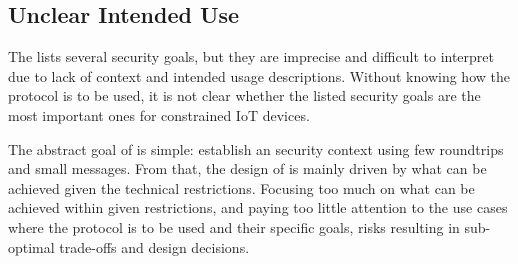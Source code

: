 \documentclass[a4paper,twoside,draft]{article}
\begin{document}
%

\subsection{Unclear Intended Use}
\label{sec:unclearProtocolUse}
%
The \mEdhoc{} \mSpec{} lists several security goals, but they are
imprecise and difficult to interpret due to lack of context and intended usage
descriptions.
%
Without knowing how the protocol is to be used,
it is not clear whether the listed security goals are the most important ones
for constrained IoT devices.
%

The abstract goal of \mEdhoc{} is simple: establish an \mOscore{} security
context using few roundtrips and small messages.
%
From that, the design of \mEdhoc{} is mainly driven by what
can be achieved given the technical restrictions.
%
Focusing too much on what can be achieved within given restrictions, and paying
too little attention to the use cases where the
protocol is to be used and their specific goals, risks resulting in
sub-optimal trade-offs and design decisions.
%
\end{document}
